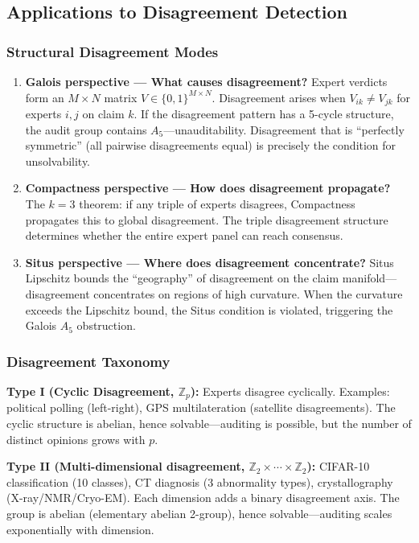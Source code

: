 \documentclass[12pt,a4paper]{article}
\theoremstyle{remark}
\begin{document}
\subsection{Applications to Disagreement Detection}
\subsubsection{Structural Disagreement Modes}
\begin{enumerate}[leftmargin=*,nosep]
    \item \textbf{Galois perspective --- What causes disagreement?} Expert verdicts form an \(M \times N\) matrix \(V \in \{0,1\}^{M \times N}\). Disagreement arises when \(V_{ik} \neq V_{jk}\) for experts \(i, j\) on claim \(k\). If the disagreement pattern has a 5-cycle structure, the audit group contains \(A_5\)---unauditability. Disagreement that is ``perfectly symmetric'' (all pairwise disagreements equal) is precisely the condition for unsolvability.
    \item \textbf{Compactness perspective --- How does disagreement propagate?} The \(k=3\) theorem: if any triple of experts disagrees, Compactness propagates this to global disagreement. The triple disagreement structure determines whether the entire expert panel can reach consensus.
    \item \textbf{Situs perspective --- Where does disagreement concentrate?} Situs Lipschitz bounds the ``geography'' of disagreement on the claim manifold---disagreement concentrates on regions of high curvature. When the curvature exceeds the Lipschitz bound, the Situs condition is violated, triggering the Galois \(A_5\) obstruction.
\end{enumerate}

\subsubsection{Disagreement Taxonomy}
\textbf{Type I (Cyclic Disagreement, \(\mathbb{Z}_p\)):} Experts disagree cyclically. Examples: political polling (left-right), GPS multilateration (satellite disagreements). The cyclic structure is abelian, hence solvable---auditing is possible, but the number of distinct opinions grows with \(p\).

\textbf{Type II (Multi-dimensional disagreement, \(\mathbb{Z}_2 \times \cdots \times \mathbb{Z}_2\)):} CIFAR-10 classification (10 classes), CT diagnosis (3 abnormality types), crystallography (X-ray/NMR/Cryo-EM). Each dimension adds a binary disagreement axis. The group is abelian (elementary abelian 2-group), hence solvable---auditing scales exponentially with dimension.
\end{document}
